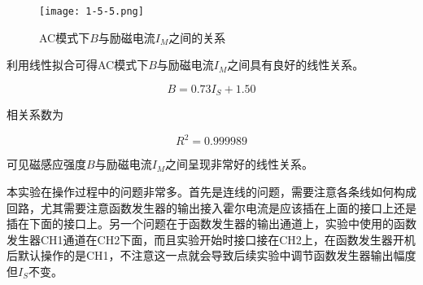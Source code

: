 \documentclass[12pt]{article}
\begin{document}
\begin{figure}[htbp]
    \centering
    \texttt{[image: 1-5-5.png]}
    \caption{AC模式下$B$与励磁电流$I_M$之间的关系}
\end{figure}

利用线性拟合可得AC模式下$B$与励磁电流$I_M$之间具有良好的线性关系。

\[
    B=0.73I_S+1.50
\]

相关系数为

\[
    R^2=0.999989
\]

可见磁感应强度$B$与励磁电流$I_M$之间呈现非常好的线性关系。

本实验在操作过程中的问题非常多。首先是连线的问题，需要注意各条线如何构成回路，尤其需要注意函数发生器的输出接入霍尔电流是应该插在上面的接口上还是插在下面的接口上。另一个问题在于函数发生器的输出通道上，实验中使用的函数发生器CH1通道在CH2下面，而且实验开始时接口接在CH2上，在函数发生器开机后默认操作的是CH1，不注意这一点就会导致后续实验中调节函数发生器输出幅度但$I_S$不变。
\end{document}
